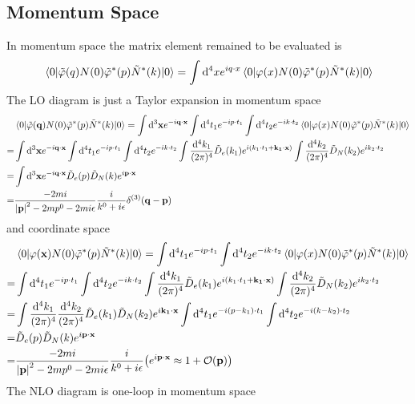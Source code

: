 \documentclass[aps,prd,preprint,showkeys,10pt]{revtex4-1}
\begin{document}
\subsection{Momentum Space}
In momentum space the matrix element remained to be evaluated is
\begin{align*}
	\mel{0}{\tilde\varphi(q)N(0)\tilde\varphi^*(p)\tilde N^*(k)}{0}=                  %
	\int\dd^4 xe^{iq\cdot x}\mel{0}{\varphi(x)N(0)\tilde\varphi^*(p)\tilde N^*(k)}{0}
\end{align*}
The LO diagram is just a Taylor expansion in momentum space
\begin{align*}
	&\mel{0}{\tilde\varphi(\vb{q})N(0)\tilde\varphi^*(p)\tilde N^*(k)}{0}=\int\dd^3 \vb{x}e^{-i\vb{q\cdot x}}\int\dd^4 t_1e^{-ip\cdot t_1}\int\dd^4 t_2e^{-ik\cdot t_2}\mel{0}{\varphi(x)N(0)\tilde\varphi^*(p)\tilde N^*(k)}{0}\\
	=&\int\dd^3 \vb{x}e^{-i\vb{q\cdot x}}\int\dd^4 t_1e^{-ip\cdot t_1}\int\dd^4 t_2e^{-ik\cdot t_2}\int\frac{\dd^4k_1}{(2\pi)^4}\tilde D_e(k_1)e^{i(k_1\cdot t_1+\vb{k_1\cdot x})}\int\frac{\dd^4k_2}{(2\pi)^4}\tilde D_N(k_2)e^{ik_2\cdot t_2}\\
	=&\int\dd^3 \vb{x}e^{-i\vb{q\cdot x}}\tilde D_e(p)\tilde D_N(k)e^{i\vb{p\cdot x}}\\
	=&\frac{-2mi}{\abs{\vb{p}}^2-2mp^0-2mi\epsilon}\frac{i}{k^0+i\epsilon}\delta^{(3)}(\vb{q-p})
\end{align*}
and coordinate space
\begin{align*}
	&\mel{0}{\varphi(\vb{x})N(0)\tilde\varphi^*(p)\tilde N^*(k)}{0}=\int\dd^4 t_1e^{-ip\cdot t_1}\int\dd^4 t_2e^{-ik\cdot t_2}\mel{0}{\varphi(x)N(0)\tilde\varphi^*(p)\tilde N^*(k)}{0}\\
	=&\int\dd^4 t_1e^{-ip\cdot t_1}\int\dd^4 t_2e^{-ik\cdot t_2}\int\frac{\dd^4k_1}{(2\pi)^4}\tilde D_e(k_1)e^{i(k_1\cdot t_1+\vb{k_1\cdot x})}\int\frac{\dd^4k_2}{(2\pi)^4}\tilde D_N(k_2)e^{ik_2\cdot t_2}\\
	=&\int\frac{\dd^4k_1}{(2\pi)^4}\frac{\dd^4k_2}{(2\pi)^4}\tilde D_e(k_1)\tilde D_N(k_2)e^{i\vb{k_1\cdot x}}\int\dd^4 t_1e^{-i(p-k_1)\cdot t_1}\int\dd^4 t_2e^{-i(k-k_2)\cdot t_2}\\
	=&\tilde D_e(p)\tilde D_N(k)e^{i\vb{p\cdot x}}\\
	=&\frac{-2mi}{\abs{\vb{p}}^2-2mp^0-2mi\epsilon}\frac{i}{k^0+i\epsilon}\pqty{e^{i\vb{p\cdot x}}\approx 1+\mathcal{O}(\vb{p})}
\end{align*}
The NLO diagram is one-loop in momentum space
\end{document}
